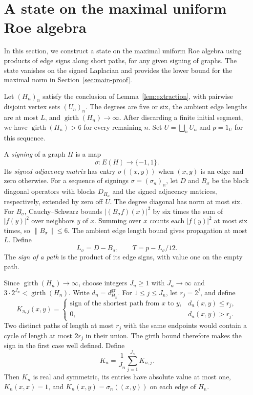 \documentclass[11pt,a4paper]{article}
\theoremstyle{definition}\newtheorem{definition}[theorem]{Definition}
\theoremstyle{remark}\newtheorem{remark}[theorem]{Remark}
\newcommand{\norm}[1]{\lVert#1\rVert}
\DeclareMathOperator{\girth}{girth}
\begin{document}
\section{A state on the maximal uniform Roe algebra}\label{sec:state}

In this section, we construct a state on the maximal
uniform Roe algebra using products of edge signs along short paths, for any given signing of graphs.
The state vanishes on the signed Laplacian and provides the lower bound
for the maximal norm in Section~\ref{sec:main-proof}.

Let $(H_n)_n$ satisfy the conclusion of Lemma~\ref{lem:extraction},
with pairwise disjoint vertex sets $(U_n)_n$. The degrees are five or six,
the ambient edge lengths are at most $L$, and $\girth(H_n)\to\infty$.
After discarding a finite initial segment, we have $\girth(H_n)>6$
for every remaining $n$. Set $U=\bigsqcup_n U_n$ and $p=1_U$ for
this sequence.

A \emph{signing} of a graph $H$ is a map 
$$\sigma:E(H)\to\{-1,1\}.$$
Its \emph{signed adjacency matrix} has entry $\sigma((x,y))$ when
$(x,y)$ is an edge and zero otherwise. For a sequence of signings
$\sigma=(\sigma_n)_n$, let $D$ and $B_\sigma$ be the block
diagonal operators with blocks $D_{H_n}$ and the signed adjacency
matrices, respectively, extended by zero off $U$. The degree diagonal
has norm at most six. For $B_\sigma$, Cauchy--Schwarz bounds
$|(B_\sigma f)(x)|^2$ by six times the sum of $|f(y)|^2$ over
neighbors $y$ of $x$. Summing over $x$ counts each $|f(y)|^2$ at
most six times, so $\norm{B_\sigma}\le6$. The ambient edge length
bound gives propagation at most $L$. Define
$$
L_\sigma=D-B_\sigma,\qquad T=p-L_\sigma/12.
$$
The \emph{sign of a path} is the product of its edge signs, with
value one on the empty path. 

Since $\girth(H_n)\to\infty$, choose integers $J_n\ge1$
with $J_n\to\infty$ and $3\cdot 2^{J_n}<\girth(H_n)$.
Write $d_n=d_{H_n}^{\mathrm{gr}}$. For $1\le j\le J_n$, let $r_j=2^j$, and define
$$
K_{n,j}(x,y)=
\begin{cases}
\text{sign of the shortest path from $x$ to $y$}, & d_n(x,y)\le r_j,\\
0, & d_n(x,y)>r_j.
\end{cases}
$$
Two distinct paths of length at most $r_j$ with the same endpoints
would contain a cycle of length at most $2r_j$ in their union.
The girth bound therefore makes the sign in the first case
well defined. Define
$$
K_n=\frac{1}{J_n}\sum_{j=1}^{J_n}K_{n,j}.
$$
Then $K_n$ is real and symmetric, its entries have absolute value
at most one, $K_n(x,x)=1$, and $K_n(x,y)=\sigma_n((x,y))$ on
each edge of $H_n$.
\end{document}
